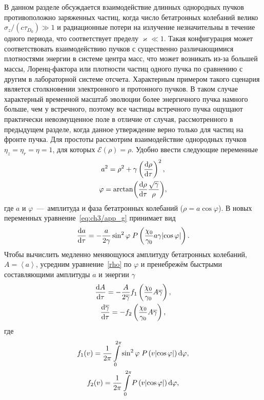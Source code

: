 В данном разделе обсуждается взаимодействие длинных однородных пучков противоположно заряженных частиц, когда число бетатронных колебаний велико $\sigma_z / (c \tau_{D_0}) \gg 1$ и радиационные потери на излучение незначительны в течение одного периода, что соответствует пределу $\varkappa \ll 1$.
Такая конфигурация может соответствовать взаимодействию пучков с существенно различающимися плотностями энергии в системе центра масс, что может возникать из-за большей массы, Лоренц-фактора или плотности частиц одного пучка по сравнению с другим в лабораторной системе отсчета.
Характерным примером такого сценария является столкновении электронного и протонного пучков.
В таком случае характерный временной масштаб эволюции более энергичного пучка намного больше, чем у встречного, поэтому все частицы встречного пучка ощущают практически невозмущенное поле в отличие от случая, рассмотренного в предыдущем разделе, когда данное утверждение верно только для частиц на фронте пучка.
Для простоты рассмотрим взаимодействие однородных пучков $\eta_z =\eta_r =\eta = 1$, для которых $\mathcal{E}(\rho) = \rho$.
Удобно ввести следующие переменные
\begin{gather}
    \label{b}
    a^{2} = \rho^{2}+\gamma\left(\dv{\rho}{\tau}\right)^2,\\
    \varphi = \arctan(\dv{\rho}{\tau}\frac{\sqrt{\gamma}}{\rho}) ,
\end{gather}
где $a$ и $\varphi$~---~амплитуда и фаза бетатронных колебаний ($\rho = a \cos\varphi $).
В новых переменных уравнение~\eqref{eq:ch3/app_g} принимает вид
\begin{equation}
    \label{rho}
    \dv{a}{\tau} = -\frac{a}{2\gamma}\sin^{2}\varphi\;P\left( \frac{\chi_0}{\gamma_0} a \gamma  |{\cos\varphi} | \right).
\end{equation}
Чтобы вычислить медленно меняющуюся амплитуду бетатронных колебаний, $A = \left\langle a\right\rangle $, усредним уравнение~\eqref{rho} по $\varphi$ и пренебрежём быстрыми составляющими амплитуды $a$ и энергии $\gamma$
\begin{gather}
    \label{dst-2}
    \dv{A}{\tau} = -\frac{A}{2\overline{\gamma}}f_{1}\left(\frac{\chi_0}{\gamma_0} A \overline{\gamma} \right),\\
    \dv{\overline{\gamma}}{\tau} = -f_{2}\left(\frac{\chi_0}{\gamma_0} A \overline{\gamma} \right),\\
\end{gather}
где 
\begin{gather}
    \label{f1}
    f_{1}(v) = \frac{1}{2\pi}\intop_{0}^{2\pi}\sin^{2}\varphi\;P\left(v|{\cos\varphi} |\right)\dd\varphi ,\\
    f_{2}(v) = \frac{1}{2\pi}\intop_{0}^{2\pi}P\left(v |{\cos\varphi}|\right)\dd\varphi ,
\end{gather}
